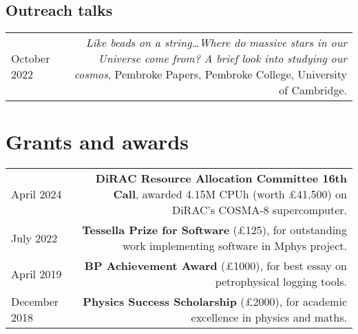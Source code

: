 \documentclass{article}
\begin{document}
\subsection*{Outreach talks}
\begin{tabular}{L!{\vrule}R}

  October 2022 & \textit{Like beads on a string\ldots Where do massive stars in our Universe come from? A brief look into studying our cosmos}, Pembroke Papers, Pembroke College, University of Cambridge. \\

\end{tabular}

\section*{Grants and awards}

\begin{tabular}{L!{\vrule}R}

    April 2024 & \textbf{DiRAC Resource Allocation Committee 16th Call}, awarded 4.15M CPUh (worth £41,500) on DiRAC's COSMA-8 supercomputer. \\
    July 2022 & \textbf{Tessella Prize for Software} (£125), for outstanding work implementing software in Mphys project. \\
    April 2019 & \textbf{BP Achievement Award} (£1000), for best essay on petrophysical logging tools. \\
    December 2018 & \textbf{Physics Success Scholarship} (£2000), for academic excellence in physics and maths.\\

\end{tabular}

\begin{comment}
\section*{Posters Presentations}

\begin{tabular}{L!{\vrule}R}
	March 2021 & \href{https://github.com/htjb/Talks/blob/master/Posters/SKA_globalemu_March_2021/globalemu.pdf}{\textit{globalemu: A novel and robust approach for emulating the sky averaged 21-cm signal from the cosmic dawn and epoch of reionization}}, A Precursor View of the SKA Sky, Virtual Conference\\
	December 2019 & \href{https://drive.google.com/file/d/1dvgumyu4cXxXqoYxikU3DKOa4u_gpGzn/view}{\textit{REACH: Radio Experiment for the Analysis of Cosmic Hydrogen}}, Science At Low Frequencies VI, Arizona State University \\
	November 2019 & \href{https://github.com/htjb/Talks/blob/master/Posters/Cav_Graduate_Conf_REACH_Nov_2019/REACH_poster.pdf}{\textit{REACH: Radio Experiment for the Analysis of Cosmic Hydrogen}}, Cavendish Graduate Conference, University of Cambridge
\end{tabular}
\end{comment}
\end{document}
